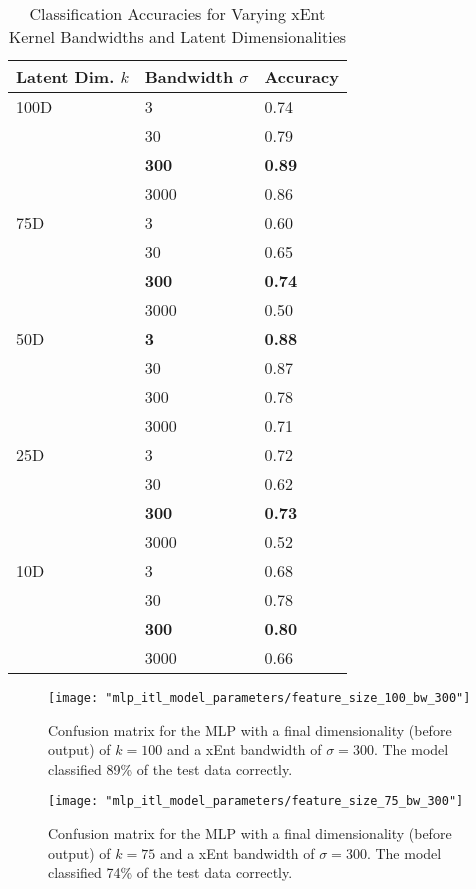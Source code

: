 \documentclass[conference]{IEEEtran}
\begin{document}
\begin{table}[h!]
	\caption{Classification Accuracies for Varying xEnt Kernel Bandwidths and Latent Dimensionalities}
	\label{tab:bw_comparison}
	\normalsize
	\begin{tabularx}{\columnwidth}{ |X|X|X| } 
		\hline
		\textbf{Latent Dim. $k$}  & \textbf{Bandwidth $\sigma$} & \textbf{Accuracy} \\
		\hline
		100D & 3 & 0.74\\
		\hline
		 & 30 & 0.79\\
		\hline
		 & \textbf{300} & \textbf{0.89}\\
		\hline
		 & 3000 & 0.86\\
		\hline
		75D & 3 & 0.60\\
		\hline
		 & 30 & 0.65\\
		\hline
		 & \textbf{300} & \textbf{0.74}\\
		\hline
		 & 3000 & 0.50\\
		\hline
		50D & \textbf{3} & \textbf{0.88}\\
		\hline
		 & 30 & 0.87\\
		\hline
		 & 300 & 0.78\\
		\hline
		 & 3000 & 0.71\\
		 \hline
		25D & 3 & 0.72\\
		\hline
		& 30 & 0.62\\
		\hline
		& \textbf{300} & \textbf{0.73}\\
		\hline
		& 3000 & 0.52\\
		\hline
		10D & 3 & 0.68\\
		\hline
		& 30 & 0.78\\
		\hline
		& \textbf{300} & \textbf{0.80}\\
		\hline
		& 3000 & 0.66\\
		\hline
	\end{tabularx}
\end{table} 


\begin{center}
	\begin{figure}[t]
		\centering
		\texttt{[image: "mlp\_itl\_model\_parameters/feature\_size\_100\_bw\_300"]}
		\caption{Confusion matrix for the MLP with a final dimensionality (before output) of $k=100$ and a xEnt bandwidth of $\sigma=300$.  The model classified 89\% of the test data correctly.}
		\label{fig:feature_size_100_bw_300}
	\end{figure}
\end{center}

\begin{center}
	\begin{figure}[t]
		\centering
		\texttt{[image: "mlp\_itl\_model\_parameters/feature\_size\_75\_bw\_300"]}
		\caption{Confusion matrix for the MLP with a final dimensionality (before output) of $k=75$ and a xEnt bandwidth of $\sigma=300$.  The model classified 74\% of the test data correctly.}
		\label{fig:feature_size_75_bw_300}
	\end{figure}
\end{center}
\end{document}
